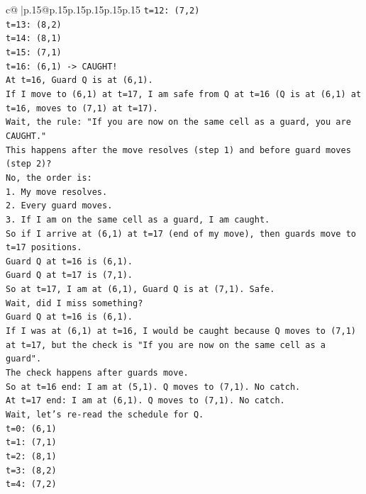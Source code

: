 \documentclass{article}
\begin{document}
{\begin{supertabular}{c@{$\;$}|p{.15\linewidth}@{}p{.15\linewidth}p{.15\linewidth}p{.15\linewidth}p{.15\linewidth}p{.15\linewidth}}
{{{\texttt{t=12: (7,2)} \\
\texttt{t=13: (8,2)} \\
\texttt{t=14: (8,1)} \\
\texttt{t=15: (7,1)} \\
\texttt{t=16: (6,1) {-}> CAUGHT!} \\
\texttt{At t=16, Guard Q is at (6,1).} \\
\texttt{If I move to (6,1) at t=17, I am safe from Q at t=16 (Q is at (6,1) at t=16, moves to (7,1) at t=17).} \\
\texttt{Wait, the rule: "If you are now on the same cell as a guard, you are CAUGHT."} \\
\texttt{This happens after the move resolves (step 1) and before guard moves (step 2)?} \\
\texttt{No, the order is:} \\
\texttt{1. My move resolves.} \\
\texttt{2. Every guard moves.} \\
\texttt{3. If I am on the same cell as a guard, I am caught.} \\
\texttt{So if I arrive at (6,1) at t=17 (end of my move), then guards move to t=17 positions.} \\
\texttt{Guard Q at t=16 is (6,1).} \\
\texttt{Guard Q at t=17 is (7,1).} \\
\texttt{So at t=17, I am at (6,1), Guard Q is at (7,1). Safe.} \\
\texttt{Wait, did I miss something?} \\
\texttt{Guard Q at t=16 is (6,1).} \\
\texttt{If I was at (6,1) at t=16, I would be caught because Q moves to (7,1) at t=17, but the check is "If you are now on the same cell as a guard".} \\
\texttt{The check happens after guards move.} \\
\texttt{So at t=16 end: I am at (5,1). Q moves to (7,1). No catch.} \\
\texttt{At t=17 end: I am at (6,1). Q moves to (7,1). No catch.} \\
\texttt{Wait, let's re{-}read the schedule for Q.} \\
\texttt{t=0: (6,1)} \\
\texttt{t=1: (7,1)} \\
\texttt{t=2: (8,1)} \\
\texttt{t=3: (8,2)} \\
\texttt{t=4: (7,2)} \\
}}}
\end{supertabular}}
\end{document}
